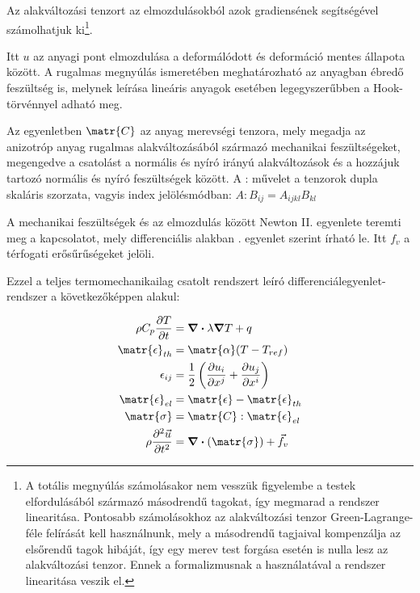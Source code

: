 Az alakváltozási tenzort az elmozdulásokból azok gradiensének segítségével számolhatjuk ki\footnote{A totális megnyúlás számolásakor nem vesszük figyelembe a testek elfordulásából származó másodrendű tagokat, így megmarad a rendszer linearitása. Pontosabb számolásokhoz az alakváltozási tenzor Green-Lagrange-féle felírását kell használnunk, mely a másodrendű tagjaival kompenzálja az elsőrendű tagok hibáját, így egy merev test forgása esetén is nulla lesz az alakváltozási tenzor. Ennek a formalizmusnak a használatával a rendszer linearitása veszik el.}.


Itt $\textit{u}$ az anyagi pont elmozdulása a deformálódott és deformáció mentes állapota között. A rugalmas megnyúlás ismeretében meghatározható az anyagban ébredő feszültség is, melynek leírása lineáris anyagok esetében legegyszerűbben a Hook-törvénnyel adható meg.


Az egyenletben $\matr{C}$ az anyag merevségi tenzora, mely megadja az anizotróp anyag rugalmas alakváltozásából származó mechanikai feszültségeket, megengedve a csatolást a normális és nyíró irányú alakváltozások és a hozzájuk tartozó normális és nyíró feszültségek között. A : művelet a tenzorok dupla skaláris szorzata, vagyis index jelölésmódban: $A:B_{ij} = A_{ijkl}B_{kl}$

A mechanikai feszültségek és az elmozdulás között Newton II. egyenlete teremti meg a kapcsolatot, mely differenciális alakban . egyenlet szerint írható le. Itt $f_v$ a térfogati erősűrűségeket jelöli.


Ezzel a teljes termomechanikailag csatolt rendszert leíró differenciálegyenlet-rendszer a következőképpen alakul:

\begin{equation}\label{eqn:thermomechanical_eqs}
    \begin{split}
        \rho C_p \frac{\partial T}{\partial t} &= \div\lambda \grad T + q \\
        \matr{\epsilon}_{th} &= \matr{\alpha}(T-T_{ref}) \\
        \epsilon_{ij} &= \frac{1}{2}\left(\frac{\partial u_i}{\partial x^j}+\frac{\partial u_j}{\partial x^i}\right) \\
        \matr{\epsilon}_{el} &= \matr{\epsilon} - \matr{\epsilon}_{th} \\
        \matr{\sigma} &= \matr{C} : \matr{\epsilon}_{el} \\
        \rho \frac{\partial^2 \vec{u}}{\partial t^2} &= \div(\matr{\sigma}) + \vec{f}_v
    \end{split}
\end{equation}

